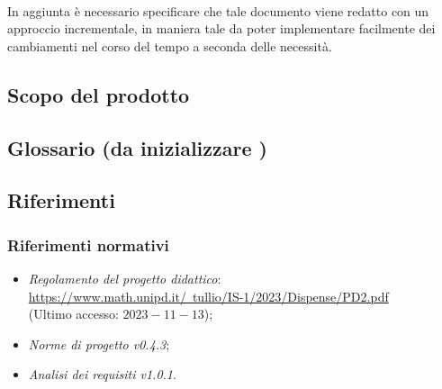 \documentclass[10pt, a4paper]{article}
\begin{document}
\paragraph{}In aggiunta è necessario specificare che tale documento viene redatto con un approccio incrementale, in maniera tale da poter implementare facilmente dei cambiamenti nel corso del tempo a seconda delle necessità.



\subsection{Scopo del prodotto}

\subsection{Glossario (da inizializzare )}

\subsection{Riferimenti}

\subsubsection{Riferimenti normativi} 
\begin{itemize}
\item \textit{Regolamento del progetto didattico}: \\
\href{https://www.math.unipd.it/~tullio/IS-1/2023/Dispense/PD2.pdf}{https://www.math.unipd.it/~tullio/IS-1/2023/Dispense/PD2.pdf}\\
(Ultimo accesso: $2023-11-13$);
\item \textit{Norme di progetto v0.4.3};
\item \textit{Analisi dei requisiti v1.0.1}.
\end{itemize}

\end{document}

